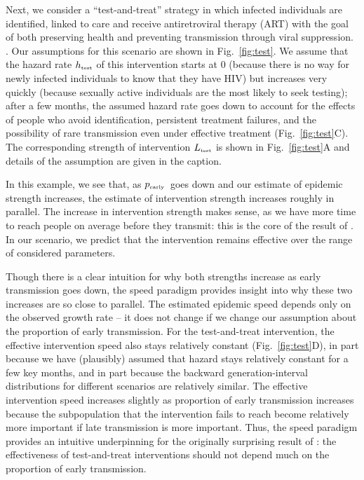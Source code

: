 \documentclass[12pt]{article}
\newcommand{\comment}{}
\renewcommand{\comment}[3]{\textcolor{#1}{\textbf{[#2: }\textit{#3}\textbf{]}}}
\renewcommand{\comment}[3]{}
\newcommand{\jd}[1]{\comment{cyan}{JD}{#1}}
\newcommand{\tsub}[2]{#1_{{\textrm{\tiny #2}}}}
\newcommand{\pEarly}{\ensuremath{\tsub{p}{early}}}
\newcommand{\figref}[1]{Fig.~\ref{fig:#1}}
\begin{document}
Next, we consider a ``test-and-treat'' strategy in which infected individuals are identified, linked to care and receive antiretroviral therapy (ART) with the goal of both preserving health and preventing transmission through viral suppression. \citep{garnett2009treating, granich2009universal, nah2017test}.
Our assumptions for this scenario are shown in \figref{test}.
We assume that the hazard rate $\tsub{h}{test}$ of this intervention starts at 0 (because there is no way for newly infected individuals to know that they have HIV) but increases very quickly (because sexually active individuals are the most likely to seek testing); 
after a few months, the assumed hazard rate goes down to account for the effects of people who avoid identification, persistent treatment failures, and the possibility of rare transmission even under effective treatment (\figref{test}C). The corresponding strength of intervention $\tsub{L}{test}$ is shown in \figref{test}A and details of the assumption are given in the caption.

In this example, we see that, as \pEarly\ goes down and our estimate of epidemic strength increases, the estimate of intervention strength increases roughly in parallel. The increase in intervention strength makes sense, as we have more time to reach people on average before they transmit: this is the core of the result of \cite{eaton2014proportion}. 
In our scenario, we predict that the intervention remains effective over the range of considered parameters.

\jd{Let's look at some GIs: high, medium and low \pEarly $\times$ intrinsic, backward}

Though there is a clear intuition for why both strengths increase as early transmission goes down, the speed paradigm provides insight into why these two increases are so close to parallel.
The estimated epidemic speed depends only on the observed growth rate -- it does not change if we change our assumption about the proportion of early transmission.
For the test-and-treat intervention, the effective intervention speed also stays relatively constant (\figref{test}D), in part because we have (plausibly) assumed that hazard stays relatively constant for a few key months, and in part because the backward generation-interval distributions for different scenarios are relatively similar.
The effective intervention speed increases slightly as proportion of early transmission increases because the subpopulation that the intervention fails to reach become relatively more important if late transmission is more important.
Thus, the speed paradigm provides an intuitive underpinning for the originally surprising result of \cite{eaton2014proportion}: the effectiveness of test-and-treat interventions should not depend much on the proportion of early transmission.
\end{document}
